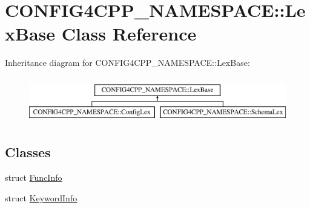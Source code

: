 \hypertarget{classCONFIG4CPP__NAMESPACE_1_1LexBase}{\section{C\-O\-N\-F\-I\-G4\-C\-P\-P\-\_\-\-N\-A\-M\-E\-S\-P\-A\-C\-E\-:\-:Lex\-Base Class Reference}
\label{classCONFIG4CPP__NAMESPACE_1_1LexBase}
}
Inheritance diagram for C\-O\-N\-F\-I\-G4\-C\-P\-P\-\_\-\-N\-A\-M\-E\-S\-P\-A\-C\-E\-:\-:Lex\-Base\-:\begin{figure}[H]
\begin{center}
\leavevmode
\includegraphics[height=2.000000cm]{classCONFIG4CPP__NAMESPACE_1_1LexBase}
\end{center}
\end{figure}
\subsection*{Classes}
\begin{DoxyCompactItemize}
\item 
struct \hyperlink{structCONFIG4CPP__NAMESPACE_1_1LexBase_1_1FuncInfo}{Func\-Info}
\item 
struct \hyperlink{structCONFIG4CPP__NAMESPACE_1_1LexBase_1_1KeywordInfo}{Keyword\-Info}
\end{DoxyCompactItemize}
